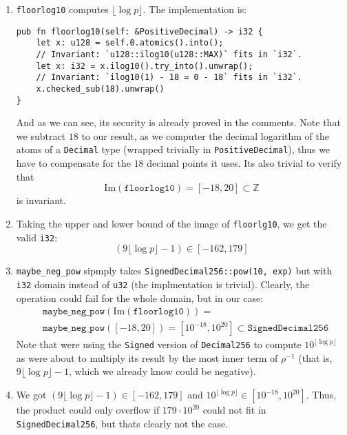 \documentclass[11pt]{article}
\begin{document}
\begin{enumerate}[label=(\arabic*).]
    \item \texttt{floorlog10} computes $\lfloor\log p\rfloor$. The implementation is:
\begin{verbatim}
pub fn floorlog10(self: &PositiveDecimal) -> i32 {
    let x: u128 = self.0.atomics().into();
    // Invariant: `u128::ilog10(u128::MAX)` fits in `i32`.
    let x: i32 = x.ilog10().try_into().unwrap();
    // Invariant: `ilog10(1) - 18 = 0 - 18` fits in `i32`.
    x.checked_sub(18).unwrap()
}
\end{verbatim}
And as we can see, its security is already proved in the comments.
Note that we subtract $18$ to our result, as we computer the decimal
logarithm of the atoms of a \texttt{Decimal} type (wrapped trivially
in \texttt{PositiveDecimal}), thus we have to compensate for the $18$
decimal points it uses. Its also trivial to verify that 
\[
\text{Im}(\texttt{floorlog10}) =[-18, 20]\subset\mathbb Z
\]
is invariant.
    \item Taking the upper and lower bound of the image of \texttt{floorlg10},
        we get the valid \texttt{i32}:
        \[
            (9\lfloor\log p\rfloor - 1) \in[-162, 179]
        \]
    \item \texttt{maybe\_neg\_pow} sipmply takes \texttt{SignedDecimal256::pow(10, exp)}
        but with \texttt{i32} domain instead of \texttt{u32} (the implmentation is trivial).
        Clearly, the operation could fail for the whole domain, but in our case:
        \begin{equation}
        \begin{split}
        &\texttt{maybe\_neg\_pow}(\text{Im}(\texttt{floorlog10}))=\\
        &\texttt{maybe\_neg\_pow}([-18, 20])
        = [10^{-18}, 10^{20}] \subset\texttt{SignedDecimal256}
        \end{split}
        \end{equation}
        Note that were using the \texttt{Signed} version of \texttt{Decimal256}
        to compute $10^{\lfloor\log p\rfloor}$ as were about to multiply its
        result by the most inner term of $\rho^{-1}$ (that is, $9\lfloor\log
        p\rfloor - 1$, which we already know could be negative).
    \item We got $(9\lfloor\log p\rfloor - 1) \in[-162, 179]$ and
        $10^{\lfloor\log p\rfloor}\in[10^{-18}, 10^{20}]$. Thus,
        the product could only overflow if $179\cdot 10^{20}$ could not fit
        in \texttt{SignedDecimal256}, but thats clearly not the case.

\end{enumerate}
\end{document}
